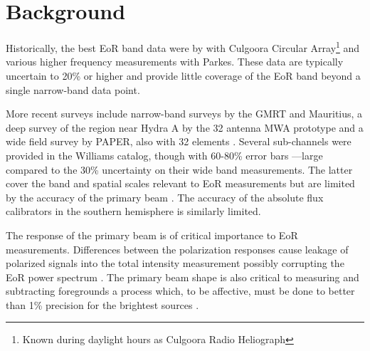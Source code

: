 \documentclass[preprint]{aastex}
\begin{document}


\section{Background}
\label{sec:background}

Historically, the best
EoR band data were by \citet{Slee:1995p7541} with Culgoora Circular
Array\footnote{Known during daylight hours as Culgoora Radio Heliograph} and
various higher frequency measurements with Parkes.  These data are typically
uncertain to 20\% or higher and provide little coverage of the EoR band beyond
a single narrow-band data point. 

More recent surveys include narrow-band surveys by the GMRT and Mauritius, a
deep survey of the region near Hydra A by the 32 antenna MWA prototype
\cite{Williams:2012p8768} and a wide field survey by PAPER, also with 32
elements \cite{Jacobs:2011p8438}. Several sub-channels were provided in the
Williams catalog, though with 60-80\% error bars ---large compared to the 30\%
uncertainty on their wide band measurements.  The latter cover the band and
spatial scales relevant to EoR measurements but are limited by the accuracy of
the primary beam \citep{Jacobs:2013p9713}. The accuracy of the absolute flux calibrators in the southern hemisphere
is similarly limited.  


The response of the primary beam is of critical importance to EoR measurements.
Differences between the polarization responses cause leakage of polarized
signals into the total intensity measurement possibly corrupting the 
EoR power spectrum \cite{Moore:2013p9621}.  The primary beam 
shape is also critical to measuring and subtracting foregrounds 
\cite{Bernardi:2012p9020} a process which, to be affective, must be done to better than 1\%
precision for the brightest sources \citet{Liu:2009p4762,Bowman:2009p7816} .
\end{document}
